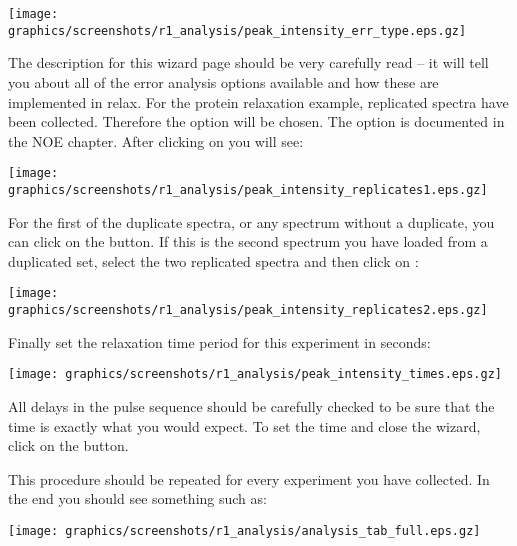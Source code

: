 \begin{minipage}[h]{\linewidth}
\centerline{\texttt{[image: graphics/screenshots/r1\_analysis/peak\_intensity\_err\_type.eps.gz]}}
\end{minipage}

The description for this wizard page should be very carefully read -- it will tell you about all of the error analysis options available and how these are implemented in relax.  For the protein relaxation example, replicated spectra have been collected.  Therefore the option  will be chosen.  The  option is documented in the NOE chapter.  After clicking on  you will see:

\begin{minipage}[h]{\linewidth}
\centerline{\texttt{[image: graphics/screenshots/r1\_analysis/peak\_intensity\_replicates1.eps.gz]}}
\end{minipage}

For the first of the duplicate spectra, or any spectrum without a duplicate, you can click on the  button.  If this is the second spectrum you have loaded from a duplicated set, select the two replicated spectra and then click on :

\begin{minipage}[h]{\linewidth}
\centerline{\texttt{[image: graphics/screenshots/r1\_analysis/peak\_intensity\_replicates2.eps.gz]}}
\end{minipage}

Finally set the relaxation time period for this experiment in seconds:

\begin{minipage}[h]{\linewidth}
\centerline{\texttt{[image: graphics/screenshots/r1\_analysis/peak\_intensity\_times.eps.gz]}}
\end{minipage}

All delays in the pulse sequence should be carefully checked to be sure that the time is exactly what you would expect.  To set the time and close the wizard, click on the  button.

This procedure should be repeated for every experiment you have collected.  In the end you should see something such as:

\begin{minipage}[h]{\linewidth}
\centerline{\texttt{[image: graphics/screenshots/r1\_analysis/analysis\_tab\_full.eps.gz]}}
\end{minipage}



